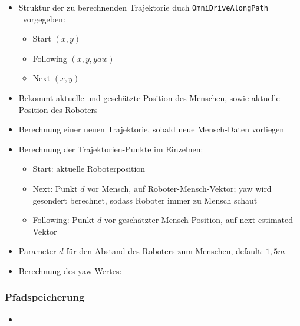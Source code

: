 \begin{itemize}
	\item Struktur der zu berechnenden Trajektorie duch \lstinline{OmniDriveAlongPath} \ vorgegeben:
	\begin{itemize}
		\item Start $(x,y)$
		\item Following $(x,y,yaw)$
		\item Next $(x,y)$
	\end{itemize}
	\item Bekommt aktuelle und geschätzte Position des Menschen, sowie aktuelle Position des Roboters
	\item Berechnung einer neuen Trajektorie, sobald neue Mensch-Daten vorliegen
	\item Berechnung der Trajektorien-Punkte im Einzelnen:
	\begin{itemize}
	  \item Start: aktuelle Roboterposition
	  \item Next: Punkt $d$ vor Mensch, auf Roboter-Mensch-Vektor; yaw wird gesondert berechnet, sodass Roboter immer zu Mensch schaut
	  \item Following: Punkt $d$ vor geschätzter Mensch-Position, auf next-estimated-Vektor 
  \end{itemize}
  \item Parameter $d$ für den Abstand des Roboters zum Menschen, default: $1,5m$
  \item Berechnung des yaw-Wertes: 
\end{itemize}




\subsubsection{Pfadspeicherung}

\begin{itemize}
  \item 
\end{itemize}


